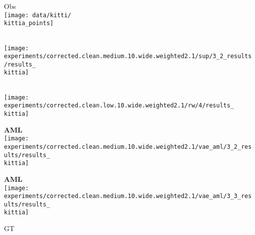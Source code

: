{\footnotesize
\newcommand{\kittia}{0}
\newcommand{\kittib}{612}
\newcommand{\kittic}{1224}
\newcommand{\kittid}{2754}
\newcommand{\kittie}{3060}
\newcommand{\kittif}{5508} %

\begin{minipage}[t]{0.15\textwidth}
	\vspace{0px}\centering
	Obs\\[-1px]
	\texttt{[image: data/kitti/\\kittia\_points]}
\end{minipage}
\begin{minipage}[t]{0.15\textwidth}
	\vspace{0px}\centering
	\cite{Dai2017CVPRa}\\[-1px]
	\texttt{[image: experiments/corrected.clean.medium.10.wide.weighted2.1/sup/3\_2\_results/results\_\\kittia]}
\end{minipage}
\begin{minipage}[t]{0.15\textwidth}
	\vspace{0px}\centering
	\cite{Engelmann2016GCPR}\\[-1px]
	\texttt{[image: experiments/corrected.clean.low.10.wide.weighted2.1/rw/4/results\_\\kittia]}
\end{minipage}
\begin{minipage}[t]{0.15\textwidth}
	\vspace{0px}\centering
	{\bf\color{MPIIorange} AML}\\[-1px]
	\texttt{[image: experiments/corrected.clean.medium.10.wide.weighted2.1/vae\_aml/3\_2\_results/results\_\\kittia]}
\end{minipage}
\begin{minipage}[t]{0.15\textwidth}
	\vspace{0px}\centering
	{\bf\color{MPIIorange} AML}\\[-1px]
	\texttt{[image: experiments/corrected.clean.medium.10.wide.weighted2.1/vae\_aml/3\_3\_results/results\_\\kittia]}
\end{minipage}
\begin{minipage}[t]{0.15\textwidth}
	\vspace{0px}\centering
	GT\\[-1px]

\end{minipage}}

